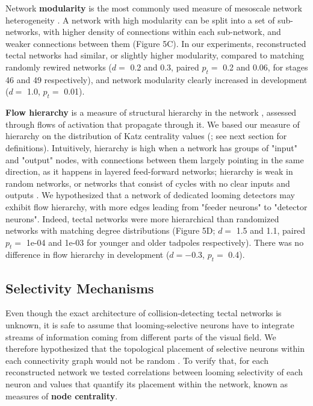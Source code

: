 \documentclass{article}
\begin{document}
Network \textbf{modularity} is the most commonly used measure of mesoscale network heterogeneity \citep{newman2006modularity, leicht2008community}. A network with high modularity can be split into a set of sub-networks, with higher density of connections within each sub-network, and weaker connections between them (Figure 5C). In our experiments, reconstructed tectal networks had similar, or slightly higher modularity, compared to matching randomly rewired networks ($d=$ 0.2 and 0.3, paired $p_t=$ 0.2 and 0.06, for stages 46 and 49 respectively), and network modularity clearly increased in development ($d=$ 1.0, $p_t =$ 0.01).

\textbf{Flow hierarchy} is a measure of structural hierarchy in the network \citep{mones2012hierarchy}, assessed through flows of activation that propagate through it. We based our measure of hierarchy on the distribution of Katz centrality values (\citealt{katz1953original, fletcher2018katz}; see next section for definitions). Intuitively, hierarchy is high when a network has groups of "input" and "output" nodes, with connections between them largely pointing in the same direction, as it happens in layered feed-forward networks; hierarchy is weak in random networks, or networks that consist of cycles with no clear inputs and outputs \citep{czegel2015hierarchy}. We hypothesized that a network of dedicated looming detectors may exhibit flow hierarchy, with more edges leading from "feeder neurons" to "detector neurons". Indeed, tectal networks were more hierarchical than randomized networks with matching degree distributions (Figure 5D; $d=$ 1.5 and 1.1, paired $p_t=$ 1e-04 and 1e-03 for younger and older tadpoles respectively). There was no difference in flow hierarchy in development ($d=-$0.3, $p_t=$ 0.4).

\subsection*{Selectivity Mechanisms}

Even though the exact architecture of collision-detecting tectal networks is unknown, it is safe to assume that looming-selective neurons have to integrate streams of information coming from different parts of the visual field. We therefore hypothesized that the topological placement of selective neurons within each connectivity graph would not be random \citep{timme2016degree}. To verify that, for each reconstructed network we tested correlations between looming selectivity of each neuron and values that quantify its placement within the network, known as measures of \textbf{node centrality}.
\end{document}
